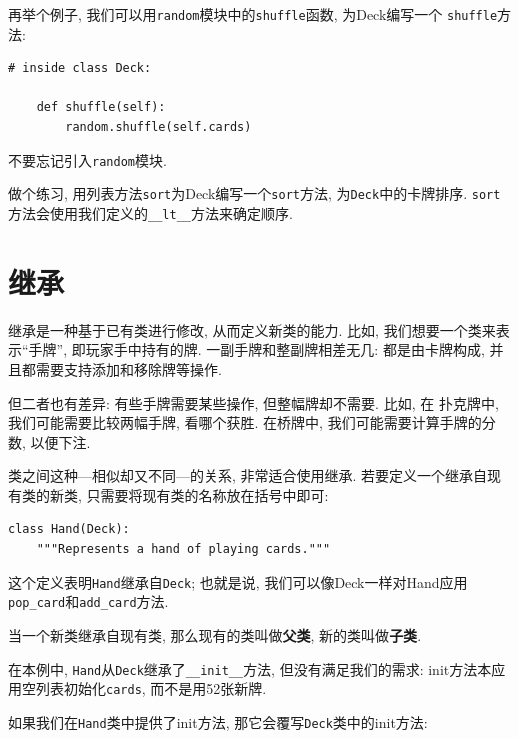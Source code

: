 \documentclass[10pt]{book}
\begin{document}
再举个例子, 我们可以用{\tt random}模块中的{\tt shuffle}函数, 为Deck编写一个
{\tt shuffle}方法:

\begin{verbatim}
# inside class Deck:
            
    def shuffle(self):
        random.shuffle(self.cards)
\end{verbatim}
%
不要忘记引入{\tt random}模块.

做个练习, 用列表方法{\tt sort}为Deck编写一个{\tt sort}方法, 
为{\tt Deck}中的卡牌排序. 
{\tt sort}方法会使用我们定义的\verb"__lt__"方法来确定顺序. 
 



\section{继承}

继承是一种基于已有类进行修改, 从而定义新类的能力. 
比如, 我们想要一个类来表示``手牌'', 即玩家手中持有的牌. 
一副手牌和整副牌相差无几: 都是由卡牌构成, 并且都需要支持添加和移除牌等操作. 

但二者也有差异: 有些手牌需要某些操作, 但整幅牌却不需要. 比如, 在
扑克牌中, 我们可能需要比较两幅手牌, 看哪个获胜. 
在桥牌中, 我们可能需要计算手牌的分数, 以便下注. 

类之间这种---相似却又不同---的关系, 非常适合使用继承. 
若要定义一个继承自现有类的新类, 只需要将现有类的名称放在括号中即可:

\begin{verbatim}
class Hand(Deck):
    """Represents a hand of playing cards."""
\end{verbatim}
%
这个定义表明{\tt Hand}继承自{\tt Deck};
也就是说, 我们可以像Deck一样对Hand应用\verb"pop_card"和\verb"add_card"方法.

当一个新类继承自现有类, 那么现有的类叫做{\bf 父类}, 
新的类叫做{\bf 子类}.

在本例中, {\tt Hand}从{\tt Deck}继承了\verb"__init__"方法, 
但没有满足我们的需求: init方法本应用空列表初始化{\tt cards}, 
而不是用52张新牌. 
 

如果我们在{\tt Hand}类中提供了init方法, 那它会覆写{\tt Deck}类中的init方法:
\end{document}
